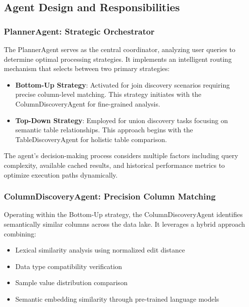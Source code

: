 \documentclass[conference]{IEEEtran}
\begin{document}
\subsection{Agent Design and Responsibilities}

\subsubsection{PlannerAgent: Strategic Orchestrator}

The PlannerAgent serves as the central coordinator, analyzing user queries to determine optimal processing strategies. It implements an intelligent routing mechanism that selects between two primary strategies:

\begin{itemize}
    \item \textbf{Bottom-Up Strategy}: Activated for join discovery scenarios requiring precise column-level matching. This strategy initiates with the ColumnDiscoveryAgent for fine-grained analysis.
    \item \textbf{Top-Down Strategy}: Employed for union discovery tasks focusing on semantic table relationships. This approach begins with the TableDiscoveryAgent for holistic table comparison.
\end{itemize}

The agent's decision-making process considers multiple factors including query complexity, available cached results, and historical performance metrics to optimize execution paths dynamically.

\subsubsection{ColumnDiscoveryAgent: Precision Column Matching}

Operating within the Bottom-Up strategy, the ColumnDiscoveryAgent identifies semantically similar columns across the data lake. It leverages a hybrid approach combining:

\begin{itemize}
    \item Lexical similarity analysis using normalized edit distance
    \item Data type compatibility verification
    \item Sample value distribution comparison
    \item Semantic embedding similarity through pre-trained language models
\end{itemize}
\end{document}
